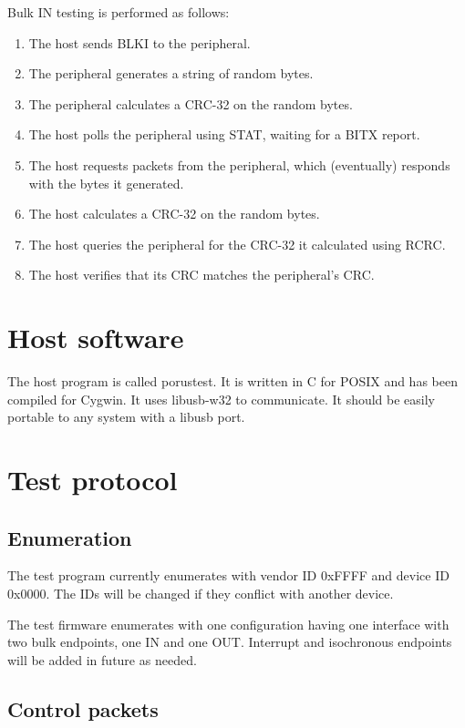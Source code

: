 \documentclass{book}
\begin{document}
Bulk IN testing is performed as follows:

\begin{enumerate}
\item The host sends BLKI to the peripheral.
\item The peripheral generates a string of random bytes.
\item The peripheral calculates a CRC-32 on the random bytes.
\item The host polls the peripheral using STAT, waiting for a BITX report.
\item The host requests packets from the peripheral, which (eventually) responds with the bytes it generated.
\item The host calculates a CRC-32 on the random bytes.
\item The host queries the peripheral for the CRC-32 it calculated using RCRC.
\item The host verifies that its CRC matches the peripheral's CRC.
\end{enumerate}

\section{Host software}

The host program is called porustest. It is written in C for POSIX and has been compiled for Cygwin.  It uses libusb-w32 to communicate.  It should be easily portable to any system with a libusb port.

\section{Test protocol}
\label{sec:test_protocol}

\subsection{Enumeration}

The test program currently enumerates with vendor ID 0xFFFF and device ID 0x0000.  The IDs will be changed if they conflict with another device.

The test firmware enumerates with one configuration having one interface with two bulk endpoints, one IN and one OUT.  Interrupt and isochronous endpoints will be added in future as needed.

\subsection{Control packets}
\end{document}
